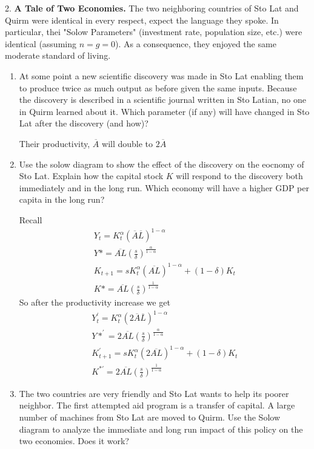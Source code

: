 \documentclass[11pt]{SelfArxOneColBMN}
\begin{document}
2. \textbf{A Tale of Two Economies.} The two neighboring countries of Sto Lat and Quirm were identical in every respect, expect the language they spoke. In particular, thei "Solow Parameters" (investment rate, population size, etc.) were identical (assuming $n = g = 0$). As a consequence, they enjoyed the same moderate standard of living.
\begin{enumerate}[label=\alph*]
  \item At some point a new scientific discovery was made in Sto Lat enabling them to produce twice as much output as before given the same inputs. Because the discovery is described in a scientific journal written in Sto Latian, no one in Quirm learned about it. Which parameter (if any) will have changed in Sto Lat after the discovery (and how)?
  \begin{solution}
    Their productivity, $\overline{A}$ will double to $2\overline{A}$
  \end{solution}
  \item Use the solow diagram to show the effect of the discovery on the eocnomy of Sto Lat. Explain how the capital stock $K$ will respond to the discovery both immediately and in the long run. Which economy will have a higher GDP per capita in the long run?
  \begin{solution}
    Recall
    \begin{eqnarray*}
      Y_t = K_t^\alpha(\overline{A}\overline{L})^{1- \alpha}\\
      Y* = \overline{AL}(\frac{s}{\delta})^\frac{\alpha}{1 - \alpha}\\
      K_{t+1} = sK_t^\alpha(\overline{AL})^{1-\alpha} + (1 - \delta)K_t\\
      K* = \overline{AL}(\frac{s}{\delta})^\frac{1}{1 - \alpha}
    \end{eqnarray*}
    So after the productivity increase we get
    \begin{eqnarray*}
      Y_t^\prime = K_t^\alpha(2\overline{A}\overline{L})^{1- \alpha}\\
      Y*^\prime = 2\overline{AL}(\frac{s}{\delta})^\frac{\alpha}{1 - \alpha}\\
      K_{t+1}^\prime = sK_t^\alpha(2\overline{AL})^{1 -\alpha} + (1 - \delta)K_t\\
      K^{*\prime} = 2\overline{AL}(\frac{s}{\delta})^\frac{1}{1 - \alpha}
    \end{eqnarray*}
  \end{solution}
  \item The two countries are very friendly and Sto Lat wants to help its poorer neighbor. The first attempted aid program is a transfer of capital. A large number of machines from Sto Lat are moved to Quirm. Use the Solow diagram to analyze the immediate and long run impact of this policy on the two economies. Does it work?

\end{enumerate}
\end{document}
